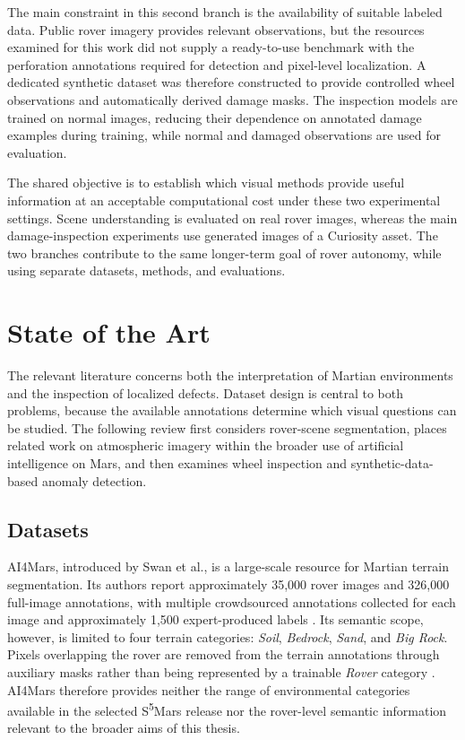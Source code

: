 The main constraint in this second branch is the availability of suitable labeled data. Public rover imagery provides relevant observations, but the resources examined for this work did not supply a ready-to-use benchmark with the perforation annotations required for detection and pixel-level localization. A dedicated synthetic dataset was therefore constructed to provide controlled wheel observations and automatically derived damage masks. The inspection models are trained on normal images, reducing their dependence on annotated damage examples during training, while normal and damaged observations are used for evaluation.

The shared objective is to establish which visual methods provide useful information at an acceptable computational cost under these two experimental settings. Scene understanding is evaluated on real rover images, whereas the main damage-inspection experiments use generated images of a Curiosity asset. The two branches contribute to the same longer-term goal of rover autonomy, while using separate datasets, methods, and evaluations.

\section{State of the Art}

The relevant literature concerns both the interpretation of Martian environments and the inspection of localized defects. Dataset design is central to both problems, because the available annotations determine which visual questions can be studied. The following review first considers rover-scene segmentation, places related work on atmospheric imagery within the broader use of artificial intelligence on Mars, and then examines wheel inspection and synthetic-data-based anomaly detection.

\subsection{Datasets}
AI4Mars, introduced by Swan et al., is a large-scale resource for Martian terrain segmentation. Its authors report approximately 35,000 rover images and 326,000 full-image annotations, with multiple crowdsourced annotations collected for each image and approximately 1,500 expert-produced labels \cite{swan2021ai4mars}. Its semantic scope, however, is limited to four terrain categories: \emph{Soil}, \emph{Bedrock}, \emph{Sand}, and \emph{Big Rock}. Pixels overlapping the rover are removed from the terrain annotations through auxiliary masks rather than being represented by a trainable \emph{Rover} category \cite{swan2021ai4mars}. AI4Mars therefore provides neither the range of environmental categories available in the selected S\textsuperscript{5}Mars release nor the rover-level semantic information relevant to the broader aims of this thesis.

